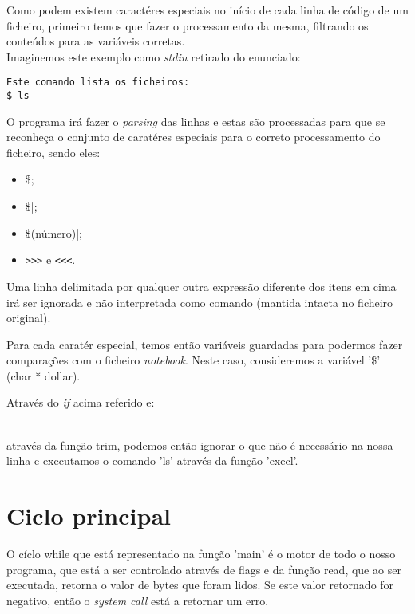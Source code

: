 \documentclass[11pt,a4paper]{report}
\begin{document}
Como podem existem caractéres especiais no início de cada linha de código de um ficheiro, primeiro temos que fazer o processamento da mesma, filtrando os conteúdos para as variáveis corretas.
~\\

Imaginemos este exemplo como \textit{stdin} retirado do enunciado:
\begin{verbatim}
Este comando lista os ficheiros:
$ ls
\end{verbatim}

O programa irá fazer o \textit{parsing} das linhas e estas são processadas para que se reconheça o conjunto de caratéres especiais para o correto processamento do ficheiro, sendo eles:

\begin{itemize}
\item \$; 
\item \$|;
\item \$(número)|;
\item \verb|>>>| e \verb|<<<|.
\end{itemize}

Uma linha delimitada por qualquer outra expressão diferente dos itens em cima irá ser ignorada e não interpretada como comando (mantida intacta no ficheiro original).

Para cada caratér especial, temos então variáveis guardadas para podermos fazer comparações com o ficheiro \textit{notebook}. Neste caso, consideremos a variável '\$' (char * dollar).




Através do \textit{if} acima referido e:

 ~\\

através da função trim, podemos então ignorar o que não é necessário na nossa linha e executamos o comando 'ls' através da função 'execl'.


\section{Ciclo principal}

O cíclo while que está representado na função 'main' é o motor de todo o nosso programa, que está a ser controlado através de flags e da função read, que ao ser executada, retorna o valor de bytes que foram lidos. Se este valor retornado for negativo, então o \textit{system call} está a retornar um erro. 
\end{document}

